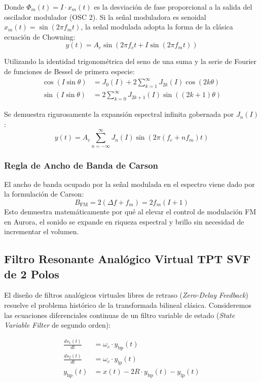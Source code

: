 \documentclass[11pt,a4paper]{article}
\begin{document}
Donde $\Phi_m(t) = I \cdot x_m(t)$ es la desviación de fase proporcional a la salida del oscilador modulador (OSC 2). Si la señal moduladora es senoidal $x_m(t) = \sin(2\pi f_m t)$, la señal modulada adopta la forma de la clásica ecuación de Chowning:
\begin{equation}
y(t) = A_c \sin\left(2\pi f_c t + I \sin(2\pi f_m t)\right)
\end{equation}

Utilizando la identidad trigonométrica del seno de una suma y la serie de Fourier de funciones de Bessel de primera especie:
\begin{align}
\cos(I \sin \theta) &= J_0(I) + 2 \sum_{k=1}^{\infty} J_{2k}(I) \cos(2k\theta) \\
\sin(I \sin \theta) &= 2 \sum_{k=0}^{\infty} J_{2k+1}(I) \sin((2k+1)\theta)
\end{align}

Se demuestra rigurosamente la expansión espectral infinita gobernada por $J_n(I)$:
\begin{equation}
y(t) = A_c \sum_{n=-\infty}^{\infty} J_n(I) \sin\left(2\pi (f_c + n f_m)t\right)
\end{equation}

\subsubsection{Regla de Ancho de Banda de Carson}
El ancho de banda ocupado por la señal modulada en el espectro viene dado por la formulación de Carson:
\begin{equation}
B_{\text{FM}} = 2(\Delta f + f_m) = 2 f_m (I + 1)
\end{equation}
Esto demuestra matemáticamente por qué al elevar el control de modulación FM en Aurora, el sonido se expande en riqueza espectral y brillo sin necesidad de incrementar el volumen.

\subsection{Filtro Resonante Analógico Virtual TPT SVF de 2 Polos}
El diseño de filtros analógicos virtuales libres de retraso (\textit{Zero-Delay Feedback}) resuelve el problema histórico de la transformada bilineal clásica. Consideremos las ecuaciones diferenciales continuas de un filtro variable de estado (\textit{State Variable Filter} de segundo orden):

\begin{align}
\frac{d s_1(t)}{dt} &= \omega_c \cdot y_{\text{bp}}(t) \\
\frac{d s_2(t)}{dt} &= \omega_c \cdot y_{\text{lp}}(t) \\
y_{\text{hp}}(t) &= x(t) - 2R \cdot y_{\text{bp}}(t) - y_{\text{lp}}(t)
\end{align}
\end{document}
